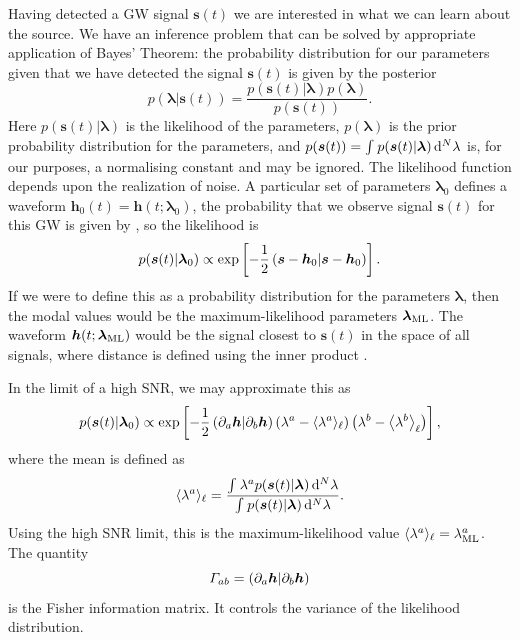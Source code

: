 Having detected a GW signal $\boldsymbol{s}(t)$ we are interested in what we can learn about the source. We have an inference problem that can be solved by appropriate application of Bayes' Theorem\cite{Jaynes2003}: the probability distribution for our parameters given that we have detected the signal $\boldsymbol{s}(t)$ is given by the posterior
\begin{equation}
p(\boldsymbol{\lambda}|\boldsymbol{s}(t)) = \frac{p(\boldsymbol{s}(t)|\boldsymbol{\lambda})p(\boldsymbol{\lambda})}{p(\boldsymbol{s}(t))}.
\end{equation}
Here $p(\boldsymbol{s}(t)|\boldsymbol{\lambda})$ is the likelihood of the parameters, $p(\boldsymbol{\lambda})$ is the prior probability distribution for the parameters, and $p(\boldsymbol{s}(t)) = \int_{}^{}{p(\boldsymbol{s}(t)|\boldsymbol{\lambda})}\,\mathrm{d}{^N \lambda}$ is, for our purposes, a normalising constant and may be ignored. The likelihood function depends upon the realization of noise. A particular set of parameters $\boldsymbol{\lambda}_0$ defines a waveform $\boldsymbol{h}_0(t) = \boldsymbol{h}(t; \boldsymbol{\lambda}_0)$, the probability that we observe signal $\boldsymbol{s}(t)$ for this GW is given by , so the likelihood is
\begin{equation}
p(\boldsymbol{s}(t)|\boldsymbol{\lambda}_0) \propto \exp\left[-\frac{1}{2}\left({\boldsymbol{s}-\boldsymbol{h}_0}\middle|{\boldsymbol{s}-\boldsymbol{h}_0}\right)\right].
\end{equation}
If we were to define this as a probability distribution for the parameters $\boldsymbol{\lambda}$, then the modal values would be the maximum-likelihood parameters $\boldsymbol{\lambda}_\mathrm{ML}$. The waveform $\boldsymbol{h}(t; \boldsymbol{\lambda}_\mathrm{ML})$ would be the signal closest to $\boldsymbol{s}(t)$ in the space of all signals, where distance is defined using the inner product \cite{Cutler1994}.

In the limit of a high SNR, we may approximate this as\cite{Vallisneri2008}
\begin{equation}
p(\boldsymbol{s}(t)|\boldsymbol{\lambda}_0) \propto \exp\left[-\frac{1}{2}\left({\partial_a\boldsymbol{h}}\middle|{\partial_b\boldsymbol{h}}\right)\left(\lambda^a - \langle\lambda^a\rangle_\ell\right)\left(\lambda^b - \left\langle\lambda^b\right\rangle_\ell\right)\right],
\end{equation}
where the mean is defined as
\begin{equation}
\langle\lambda^a\rangle_\ell = \frac{\int_{}^{}{\lambda^a p(\boldsymbol{s}(t)|\boldsymbol{\lambda})}\,\mathrm{d}{^N \lambda}}{\int_{}^{}{p(\boldsymbol{s}(t)|\boldsymbol{\lambda})}\,\mathrm{d}{^N \lambda}}.
\end{equation}
Using the high SNR limit, this is the maximum-likelihood value $\langle\lambda^a\rangle_\ell = \lambda^a_\mathrm{ML}$. The quantity
\begin{equation}
\Gamma_{ab} = \left({\partial_a\boldsymbol{h}}\middle|{\partial_b\boldsymbol{h}}\right)
\end{equation}
is the Fisher information matrix. It controls the variance of the likelihood distribution.

